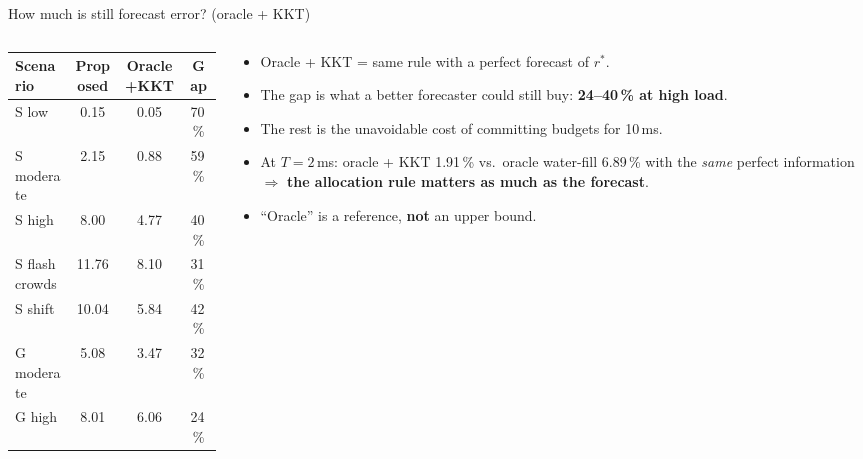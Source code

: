 \documentclass[aspectratio=169,11pt,xcolor=table]{beamer}
\newcommand{\rstar}{r^{\ast}}
\begin{document}
\begin{frame}{How much is still forecast error? (oracle + KKT)}
  \begin{columns}[c]
    \begin{column}{0.48\textwidth}
      \small
      \centering
      \begin{tabular}{lccc}
        \toprule
        Scenario & Proposed & Oracle+KKT & Gap \\
        \midrule
        S low & 0.15 & 0.05 & 70\,\% \\
        S moderate & 2.15 & 0.88 & 59\,\% \\
        S high & 8.00 & 4.77 & 40\,\% \\
        S flash crowds & 11.76 & 8.10 & 31\,\% \\
        S shift & 10.04 & 5.84 & 42\,\% \\
        G moderate & 5.08 & 3.47 & 32\,\% \\
        G high & 8.01 & 6.06 & 24\,\% \\
        \bottomrule
      \end{tabular}
    \end{column}
    \begin{column}{0.5\textwidth}
      \begin{itemize}
        \item Oracle + KKT = same rule with a perfect forecast of $\rstar$.
        \item The gap is what a better forecaster could still buy: \textbf{24--40\,\% at high load}.
        \item The rest is the unavoidable cost of committing budgets for 10\,ms.
        \item At $T = 2$\,ms: oracle + KKT 1.91\,\% vs.\ oracle water-fill 6.89\,\% with the \emph{same} perfect information $\Rightarrow$ \textbf{the allocation rule matters as much as the forecast}.
        \item ``Oracle'' is a reference, \textbf{not} an upper bound.
      \end{itemize}
    \end{column}
  \end{columns}
\end{frame}
\end{document}
